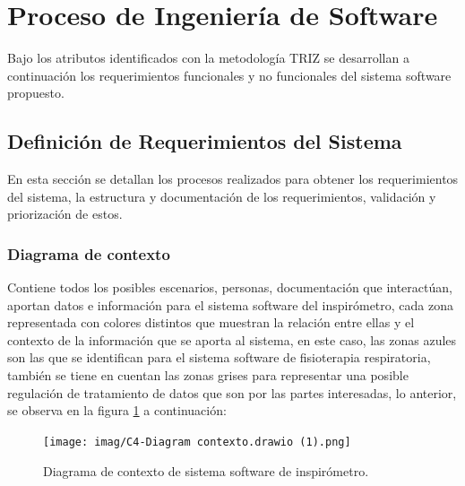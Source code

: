 \documentclass[12pt]{article}
\begin{document}
\newpage
\section{Proceso de Ingeniería de Software  } %



Bajo los atributos identificados con la metodología TRIZ se desarrollan a continuación los requerimientos funcionales y no funcionales del sistema software propuesto.


\subsection{Definición de Requerimientos del Sistema}

En esta sección se detallan los procesos realizados para obtener los requerimientos del sistema, la estructura y documentación de los requerimientos, validación y priorización de estos.

\subsubsection{Diagrama de contexto} %

Contiene todos los posibles escenarios, personas, documentación que interactúan, aportan datos e información para el sistema software del inspirómetro, cada zona representada con colores distintos que muestran la relación entre ellas y el contexto de la información que se aporta al sistema, en este caso, las zonas azules son las que se identifican para el sistema software de fisioterapia respiratoria, también se tiene en cuentan las zonas grises para representar una posible regulación de tratamiento de datos que son por las partes interesadas, lo anterior, se observa en la figura \ref{7} a continuación:

\begin{figure}[ht]
\centering
\texttt{[image: imag/C4-Diagram contexto.drawio (1).png]}
\caption{Diagrama de contexto de sistema software de inspirómetro. }
\label{7}
\end{figure}
\FloatBarrier
\end{document}
